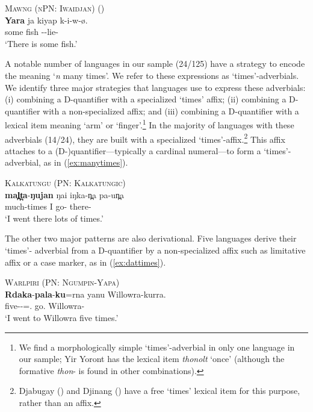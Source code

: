 \documentclass[12pt,egregdoesnotlikesansseriftitles]{scrartcl}
\begin{document}
\begin{exe}
  \ex\label{ex:dyara} \textsc{Mawng (nPN: Iwaidjan)} \hfill (\citealt{ngaralk})\\
  \gll \textbf{Yara} ja kiyap k-i-w-ø.\\
  some \Clm{} fish \Prs-\Tsg\Clm-lie-\Np\\
  \glt `There is some fish.' %
\end{exe}


A notable number of languages in our sample (24/125) have a strategy to encode the meaning `\textit{n} many times'. We refer to these expressions as `times'-adverbials. We identify three major strategies that languages use to express these adverbials: (i) combining a D-quantifier with a specialized `times' affix; (ii) combining a D-quantifier with a non-specialized affix; and (iii) combining a D-quantifier with a lexical item meaning `arm' or `finger'.\footnote{We find a morphologically simple `times'-adverbial in only one language in our sample; Yir Yoront  has the lexical item \textit{thonolt} `once' (although the formative \textit{thon}- is found in other combinations).}  In the majority of languages with  these adverbials (14/24), they are built with a specialized `times'-affix.\footnote{Djabugay (\citealt{patz91}) and Djinang (\citealt{waters83}) have a free `times' lexical item for this purpose, rather than an affix.} This affix attaches to a (D-)quantifier---typically a cardinal numeral---to form a `times'-adverbial, as in (\ref{ex:manytimes}). 
\begin{exe}
  \ex\label{ex:manytimes} \textsc{Kalkatungu (PN: Kalkatungic)}\hfill {}\\
  \gll \textbf{mal̪t̪a}-\textbf{ŋujan} ŋai iŋka-n̪a pa-un̪a\\
  much-times I go-\Pst{} there-\All\\
  \glt `I went there lots of times.'
\end{exe}

The other two major patterns are also derivational. Five languages derive their `times'- adverbial from a D-quantifier by a non-specialized affix such as limitative affix or a case marker, as in  (\ref{ex:dattimes}).
\begin{exe}
  \ex\label{ex:dattimes} \textsc{Warlpiri (PN: Ngumpin-Yapa)}\hfill {}\\
  \gll \textbf{Rdaka}-\textbf{pala}-\textbf{ku}=rna yanu Willowra-kurra.\\
  five-\Card-\Dat=\Fsg.\Sbj{} go.\Pst{} Willowra-\All\\
  \glt `I went to Willowra five times.'
\end{exe}
  
\end{document}

